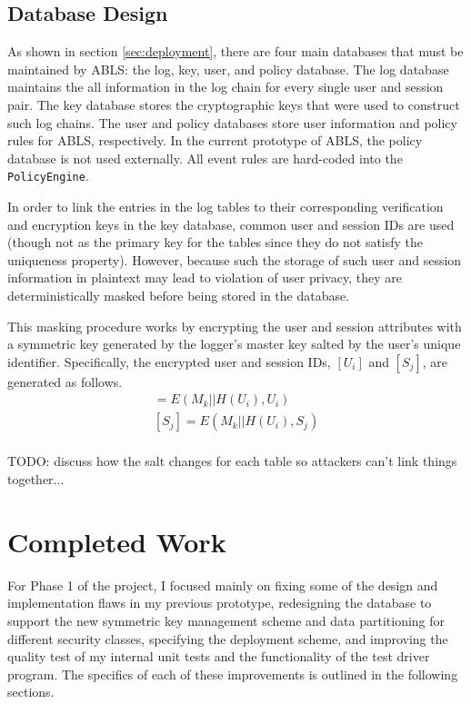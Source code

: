 \documentclass{sig-alternate}
\begin{document}
\subsection{Database Design}
\label{sec:databaseDesign}
As shown in section \ref{sec:deployment}, there are four main databases that must be maintained by ABLS:
the log, key, user, and policy database. The log database maintains the all information in the log chain for every 
single user and session pair. The key database stores the cryptographic keys that were used to construct
such log chains. The user and policy databases store user information and policy rules for ABLS, respectively. 
In the current prototype of ABLS, the policy database is not used externally. All event rules are hard-coded into
the {\tt PolicyEngine}. 

In order to link the entries in the log tables to their corresponding verification and encryption keys in the key database,
common user and session IDs are used (though not as the primary key for the tables since they do not satisfy
the uniqueness property). However, because such the storage of such user and session information in plaintext
may lead to violation of user privacy, they are deterministically masked before being stored in the database. 

This masking procedure works by encrypting the user and session attributes with a symmetric key generated
by the logger's master key salted by the user's unique identifier. Specifically, the encrypted user and session IDs, 
$[U_i]$ and $[S_j]$, are generated as follows.
\begin{align*}
[U_i] = E(M_k || H(U_i), U_i) \\
[S_j] = E(M_k || H(U_i), S_j) \\
\end{align*}

TODO: discuss how the salt changes for each table so attackers can't link things together...


\newpage

\section{Completed Work}
For Phase 1 of the project, I focused mainly on fixing some of the design and implementation flaws in my previous 
prototype, redesigning the database to support the new symmetric key management scheme and data 
partitioning for different security classes, specifying the deployment scheme, and improving the quality test
of my internal unit tests and the functionality of the test driver program. The specifics of each of these improvements is
outlined in the following sections.
\end{document}
